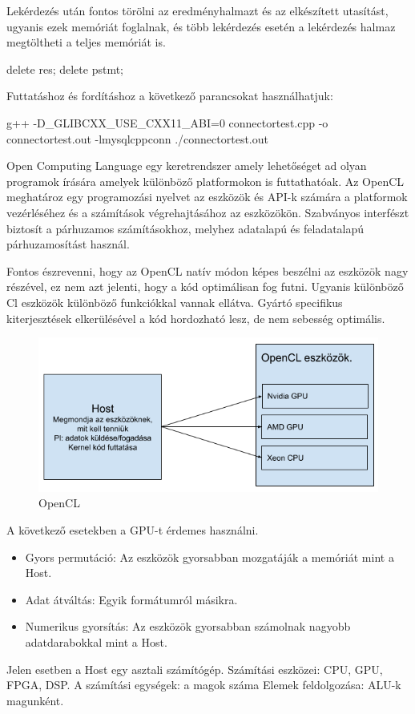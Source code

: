 Lekérdezés után fontos törölni az eredményhalmazt és az elkészített utasítást, ugyanis ezek memóriát foglalnak, és több lekérdezés esetén a lekérdezés halmaz megtöltheti a teljes memóriát is. 
\begin{cpp}
    delete res;
    delete pstmt;
\end{cpp}


Futtatáshoz és fordításhoz a következő parancsokat használhatjuk: 
\begin{python}
g++ -D_GLIBCXX_USE_CXX11_ABI=0 connectortest.cpp -o connectortest.out -lmysqlcppconn
./connectortest.out
\end{python}



Open Computing Language egy keretrendszer amely lehetőséget ad olyan programok írására amelyek különböző platformokon is futtathatóak.
Az OpenCL meghatároz egy programozási nyelvet az eszközök és API-k számára a platformok vezérléséhez és a számítások végrehajtásához az eszközökön. Szabványos interfészt biztosít a párhuzamos számításokhoz, melyhez adatalapú és feladatalapú párhuzamosítást használ.

Fontos észrevenni, hogy az OpenCL natív módon képes beszélni az eszközök nagy részével, ez nem azt jelenti, hogy a kód optimálisan fog futni. Ugyanis különböző Cl eszközök különböző funkciókkal vannak ellátva. Gyártó specifikus kiterjesztések elkerülésével a kód hordozható lesz, de nem sebesség optimális.

\begin{figure}[h!]
\centering
\includegraphics[width=\textwidth]{images/opencl.png}
\caption{OpenCL}
\label{fig:opencl}
\end{figure}

A következő esetekben a GPU-t érdemes használni.
\begin{itemize}
\item Gyors permutáció: Az eszközök gyorsabban mozgatáják a memóriát mint a Host.
\item Adat átváltás: Egyik formátumról másikra.
\item Numerikus gyorsítás: Az eszközök gyorsabban számolnak nagyobb adatdarabokkal mint a Host.
\end{itemize}
Jelen esetben a Host egy asztali számítógép.
Számítási eszközei: CPU, GPU, FPGA, DSP.
A számítási egységek: a magok száma
Elemek feldolgozása: ALU-k magunként.

